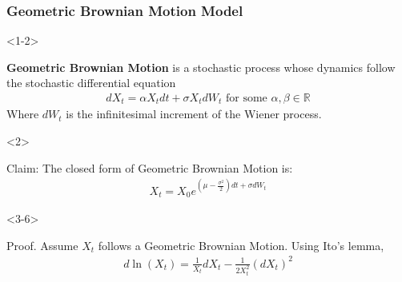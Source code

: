 \documentclass[10pt]{beamer}
\begin{document}
\begin{frame}[t]
  \frametitle{Geometric Brownian Motion Model}
  \begin{onlyenv}<1-2>
    \begin{definition}
      \textbf{Geometric Brownian Motion} is a stochastic process whose dynamics follow the stochastic differential equation 
      \begin{align*}
        dX_t = \alpha X_t dt + \sigma X_t dW_t \text{ for some } \alpha,\beta \in \mathbb{R}
      \end{align*}
      Where $dW_t$ is the infinitesimal increment of the Wiener process.
    \end{definition}
  \end{onlyenv}
  \begin{onlyenv}<2>
    \begin{block}{Claim:}
      The closed form of Geometric Brownian Motion is:
      \begin{align*}
        X_t = X_0 e^{(\mu - \frac{\sigma^2}{2})dt + \sigma dW_t}
      \end{align*}
    \end{block}
  \end{onlyenv}
  \begin{onlyenv}<3-6>
    \begin{block}{Proof.}
      Assume $X_t$ follows a Geometric Brownian Motion. Using Ito's lemma,
      \begin{align*}
        d\ln(X_t) = \frac{1}{X_t}dX_t - \frac{1}{2X_t^2}(dX_t)^2
      \end{align*}
    \end{block}

\end{onlyenv}
\end{frame}
\end{document}

